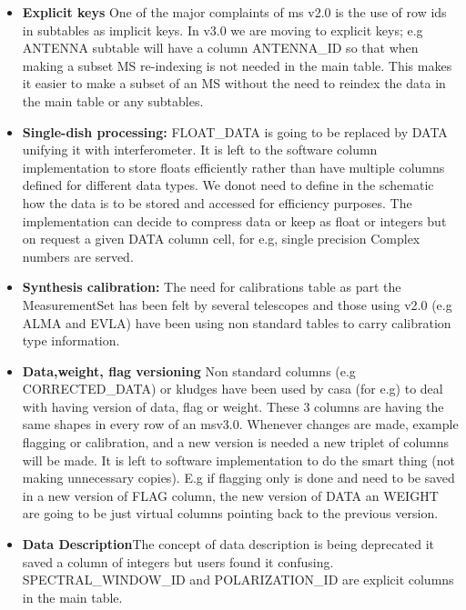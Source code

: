 \documentclass{article}
\begin{document}
\begin{itemize}

\item{{\bf Explicit keys} One of the major complaints of ms v2.0 is
  the use of row ids in subtables as implicit keys. In v3.0 we are
  moving to explicit keys; e.g ANTENNA subtable will have a column
  ANTENNA\_ID so that when making a subset MS re-indexing is not
  needed in the main table. This makes it easier to make a subset of
  an MS without the need to reindex the data in the main table or any
  subtables.}

\item{{\bf Single-dish processing:} FLOAT\_DATA is going to be
  replaced by DATA unifying it with interferometer. It is left to the
  software column implementation to store floats efficiently rather
  than have multiple columns defined for different data types. We
  donot need to define in the schematic how the data is to be stored
  and accessed for efficiency purposes. The implementation can decide
  to compress data or keep as float or integers but on request a given
  DATA column cell, for e.g, single precision Complex numbers are
  served.}


\item{{\bf Synthesis calibration:} The need for calibrations table as
    part the MeasurementSet has been felt by several telescopes and
    those using v2.0 (e.g ALMA and EVLA) have been using non standard
    tables to carry calibration type information.}

\item{{\bf Data,weight, flag versioning} Non standard columns (e.g
    CORRECTED\_DATA) or kludges have been used by casa (for e.g) to
    deal with having version of data, flag or weight. These 3 columns
    are having the same shapes in every row of an msv3.0.  Whenever
    changes are made, example flagging or calibration, and a new version
    is needed a new triplet of columns will be made. It is left to
    software implementation to do the smart thing (not making
    unnecessary copies). E.g if flagging only is done and need to be
    saved in a new version of FLAG column, the new version of DATA an
    WEIGHT are going to be just virtual columns pointing back to the
    previous version.}

\item{{\bf Data Description}The concept of data description is being
    deprecated it saved a column of integers but users found it
    confusing. SPECTRAL\_WINDOW\_ID and POLARIZATION\_ID are explicit
    columns in the main table.}


\end{itemize}
\end{document}
